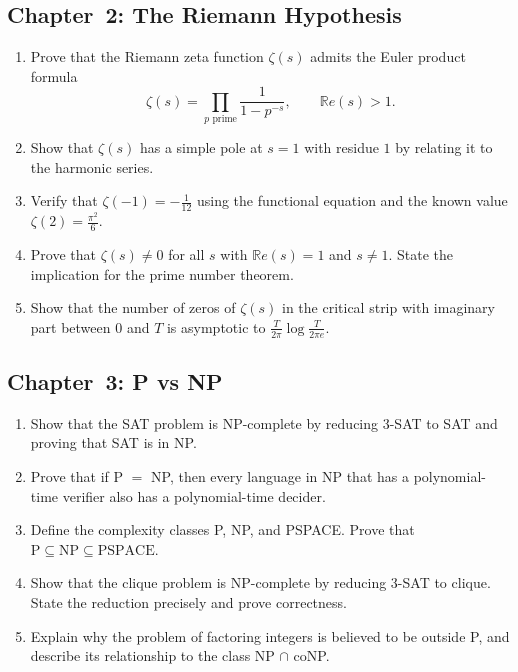 \subsection{Chapter~2: The Riemann Hypothesis}

\begin{enumerate}[label=\textbf{2.\arabic*.},leftmargin=2.5em]
\item Prove that the Riemann zeta function $\zeta(s)$ admits the Euler product formula
\[
\zeta(s) = \prod_{p \text{ prime}} \frac{1}{1 - p^{-s}}, \qquad \mathbb{R}e(s) > 1.
\]

\item Show that $\zeta(s)$ has a simple pole at $s = 1$ with residue $1$ by relating it to the harmonic series.

\item Verify that $\zeta(-1) = -\tfrac{1}{12}$ using the functional equation and the known value $\zeta(2) = \tfrac{\pi^2}{6}$.

\item Prove that $\zeta(s) \neq 0$ for all $s$ with $\mathbb{R}e(s) = 1$ and $s \neq 1$. State the implication for the prime number theorem.

\item Show that the number of zeros of $\zeta(s)$ in the critical strip with imaginary part between $0$ and $T$ is asymptotic to $\frac{T}{2\pi} \log \frac{T}{2\pi e}$.
\end{enumerate}

\subsection{Chapter~3: P vs NP}

\begin{enumerate}[label=\textbf{3.\arabic*.},leftmargin=2.5em]
\item Show that the SAT problem is NP-complete by reducing 3-SAT to SAT and proving that SAT is in NP.

\item Prove that if P $=$ NP, then every language in NP that has a polynomial-time verifier also has a polynomial-time decider.

\item Define the complexity classes P, NP, and PSPACE. Prove that $\text{P} \subseteq \text{NP} \subseteq \text{PSPACE}$.

\item Show that the clique problem is NP-complete by reducing 3-SAT to clique. State the reduction precisely and prove correctness.

\item Explain why the problem of factoring integers is believed to be outside P, and describe its relationship to the class NP $\cap$ coNP.
\end{enumerate}

